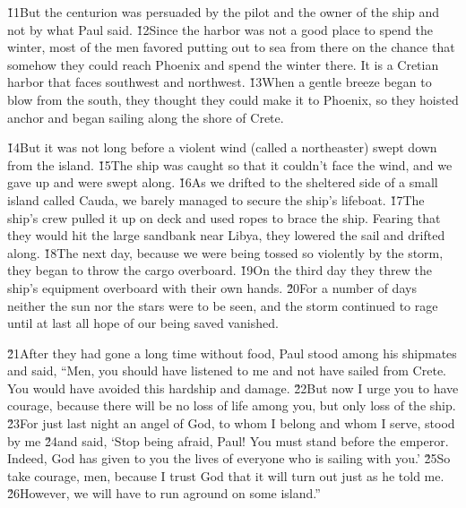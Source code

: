 \v{11}But the centurion was persuaded by the pilot and the owner of the ship and not by what Paul said. \v{12}Since the harbor was not a good place to spend the winter, most of the men favored putting out to sea from there on the chance that somehow they could reach Phoenix and spend the winter there. It is a Cretian harbor that faces southwest and northwest. \v{13}When a gentle breeze began to blow from the south, they thought they could make it to Phoenix, so they hoisted anchor and began sailing along the shore of Crete.

\v{14}But it was not long before a violent wind (called a northeaster) swept down from the island. \v{15}The ship was caught so that it couldn't face the wind, and we gave up and were swept along. \v{16}As we drifted to the sheltered side of a small island called Cauda, we barely managed to secure the ship's lifeboat. \v{17}The ship's crew pulled it up on deck and used ropes to brace the ship. Fearing that they would hit the large sandbank near Libya, they lowered the sail and drifted along. \v{18}The next day, because we were being tossed so violently by the storm, they began to throw the cargo overboard. \v{19}On the third day they threw the ship's equipment overboard with their own hands. \v{20}For a number of days neither the sun nor the stars were to be seen, and the storm continued to rage until at last all hope of our being saved vanished.

\v{21}After they had gone a long time without food, Paul stood among his shipmates and said, ``Men, you should have listened to me and not have sailed from Crete. You would have avoided this hardship and damage. \v{22}But now I urge you to have courage, because there will be no loss of life among you, but only loss of the ship. \v{23}For just last night an angel of God, to whom I belong and whom I serve, stood by me \v{24}and said, `Stop being afraid, Paul! You must stand before the emperor. Indeed, God has given to you the lives of everyone who is sailing with you.' \v{25}So take courage, men, because I trust God that it will turn out just as he told me. \v{26}However, we will have to run aground on some island.''

